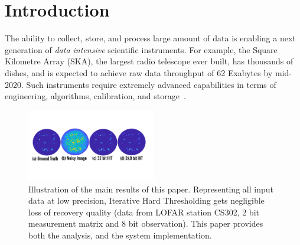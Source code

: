 \documentclass{article}
\begin{document}
\section{Introduction}

The ability to collect, store, and process large amount of
data is enabling a next generation of {\em data intensive} scientific 
instruments. For example,
the Square Kilometre Array (SKA), the largest
radio telescope ever built, has thousands of 
dishes, and is expected to achieve
raw data throughput of 62 Exabytes by mid-2020.
Such instruments require extremely advanced  
capabilities in terms of engineering, algorithms, calibration, and storage~\cite{hu}. 

\begin{figure}\label{sky_images}
  \centering
    \includegraphics[width=0.5\textwidth]{figs/sky_images2.pdf}
  \caption{Illustration of the main results of this paper. Representing all input data at 
  low precision, Iterative Hard Thresholding gets negligible loss of recovery quality (data from LOFAR station CS302, 2 bit measurement matrix and 8 bit observation). This paper provides both  the analysis, and the system implementation.}
  \label{fig:sky_images}
\end{figure}
\end{document}
